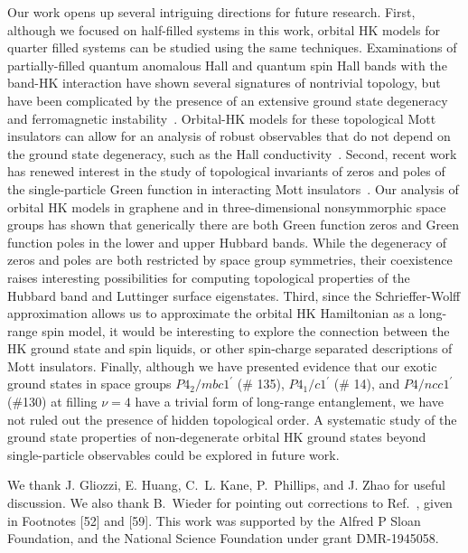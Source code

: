 \documentclass[prb,aps,amssymb,twocolumn,notitlepage]{revtex4-2}
\begin{document}
Our work opens up several intriguing directions for future research. 
First, although we focused on half-filled systems in this work, orbital HK models for quarter filled systems can be studied using the same techniques. 
Examinations of partially-filled quantum anomalous Hall and quantum spin Hall bands with the band-HK interaction have shown several signatures of nontrivial topology, but have been complicated by the presence of an extensive ground state degeneracy and ferromagnetic instability~\cite{2022PhilipSpinHallHK,mai2023topological}. 
Orbital-HK models for these topological Mott insulators can allow for an analysis of robust observables that do not depend on the ground state degeneracy, such as the Hall conductivity~\cite{zhao2023failure}. 
Second, recent work has renewed interest in the study of topological invariants of zeros and poles of the single-particle Green function in interacting Mott insulators~\cite{setty2023symmetry,wagner2023mott}. 
Our analysis of orbital HK models in graphene and in three-dimensional nonsymmorphic space groups has shown that generically there are both Green function zeros and Green function poles in the lower and upper Hubbard bands. 
While the degeneracy of zeros and poles are both restricted by space group symmetries, their coexistence raises interesting possibilities for computing topological properties of the Hubbard band and Luttinger surface eigenstates. 
Third, since the Schrieffer-Wolff approximation allows us to approximate the orbital HK Hamiltonian as a long-range spin model, it would be interesting to explore the connection between the HK ground state and spin liquids, or other spin-charge separated descriptions of Mott insulators. 
Finally, although we have presented evidence that our exotic ground states in space groups $P4_2/mbc1^\prime$ (\# 135), $P4_1/c1^\prime$ (\# 14), and $P4/ncc1^\prime$ (\#130) at filling $\nu=4$ have a trivial form of long-range entanglement, we have not ruled out the presence of hidden topological order. 
A systematic study of the ground state properties of non-degenerate orbital HK ground states beyond single-particle observables could be explored in future work.






\begin{acknowledgments}
We thank  J. Gliozzi, E. Huang, C.~L. 
Kane, P.~Phillips, and J. Zhao for useful discussion. 
We also thank B.~Wieder for pointing out corrections to Ref.~\cite{wieder2016double}, given in Footnotes [52] and [59]. 
This work was supported by the Alfred P Sloan Foundation, and the National Science Foundation under grant DMR-1945058.
\end{acknowledgments}
\end{document}
